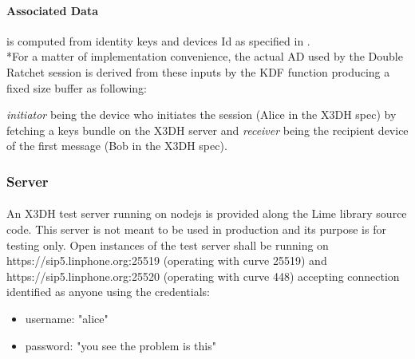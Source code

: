\documentclass[a4paper,11pt]{article}
\begin{document}
      \paragraph{Associated Data} is computed from identity keys and devices Id as specified in \cite[section 3.3]{x3dh}.\\*For a matter of implementation convenience, the actual AD used by the Double Ratchet session is derived from these inputs by the KDF function producing a fixed size buffer as following:
          \textit{initiator} being the device who initiates the session (Alice in the X3DH spec) by fetching a keys bundle on the X3DH server and \textit{receiver} being the recipient device of the first message (Bob in the X3DH spec).
    \subsubsection{Server}
      \paragraph*{}An X3DH test server running on nodejs is provided along the Lime library source code. This server is not meant to be used in production and its purpose is for testing only. Open instances of the test server shall be running on https://sip5.linphone.org:25519 (operating with curve 25519) and https://sip5.linphone.org:25520 (operating with curve 448) accepting connection identified as anyone using the credentials:
      \begin{itemize}
        \item username: "alice"
        \item password: "you see the problem is this"
      \end{itemize}
\end{document}
